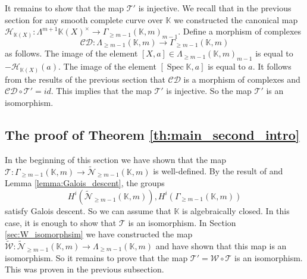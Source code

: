 \documentclass[12pt]{extarticle}
\def\mb{\mathbb}
\def\mc{\mathcal}
\def\L{\Lambda}
\def\k{\mb K}
\def\cl{\colon}
\def\wt{\widetilde}
\def\T{\mc T}
\def\W{\mc W}
\def \tW{\wt{\W}}
\def \wW{\tW}
\def \wL{\L_{\geq m-1}}
\def \CH{\mc{N}}
\def \wCH{\wt{\CH}_{\geq m-1}}
\def \wG{\Gamma_{\geq m-1}}
\newcommand{\EP}[2]{{\Lambda^{#1}\k(#2)^\times}}
\DeclareMathOperator{\spec}{Spec}
\begin{document}
It remains to show that the map $\T'$ is injective. We recall that in the previous section for any smooth complete curve over $\k$ we constructed the canonical map $\mc{H}_{\k(X)}\cl \EP{m+1}{X}\to \wG(\k,m)_{m-1}$. Define a morphism of complexes 
$$\mc{CD}\colon \wL(\k,m)\to \wG(\k,m)$$
as follows. The image of the element $[X, a]\in \wL(\k,m)_{m-1}$ is equal to $-\mc H_{\k(X)}(a)$. The image of the element $[\spec \k, a]$ is equal to $a$. It follows from the results of the previous section that $\mc{CD}$ is a morphism of complexes and $\mc{CD}\circ \T'=id$. This implies that the map $\mc T'$ is injective. So the map $\T'$ is an isomorphism.

\subsection{The proof of Theorem \ref{th:main_second_intro}}In the beginning of this section we have shown that the map $\T\cl \wG(\k,m)\to\wCH(\k,m)$ is well-defined. By the result of \cite{rudenko2021strong} and Lemma \ref{lemma:Galois_descent}, the groups $$H^i(\wCH(\k,m)), H^i(\wG(\k,m))$$ satisfy Galois descent. So we can assume that $\k$ is algebraically closed. In this case, it is enough to show that $\T$ is an isomorphism. In Section \ref{sec:W_isomorphsim} we have constructed the map $\wW\cl \wCH(\k,m)\to \wL(\k,m)$ and have shown that this map is an isomorphism. So it remains to prove that the map $\T'=\W\circ\T$ is an isomorphism. This was proven in the previous subsection.
\end{document}
